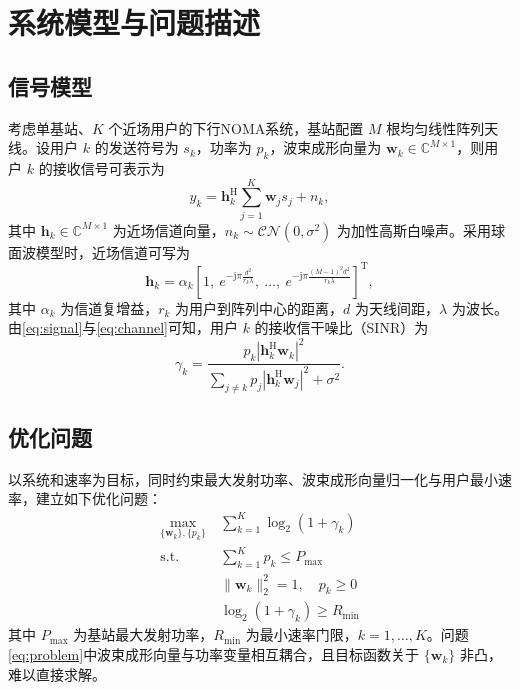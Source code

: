 \documentclass[UTF8, a4paper, zihao=-4, fontset=windows, twocolumn]{ctexart}
\theoremstyle{plain}
\theoremstyle{definition}
\theoremstyle{plain}
\begin{document}
\section{系统模型与问题描述}\label{sec:model}

\subsection{信号模型}\label{sec:signal}

考虑单基站、$K$ 个近场用户的下行NOMA系统，基站配置 $M$ 根均匀线性阵列天线。设用户 $k$ 的发送符号为 $s_k$，功率为 $p_k$，波束成形向量为 $\mathbf{w}_k\in\mathbb{C}^{M\times 1}$，则用户 $k$ 的接收信号可表示为
\begin{equation}
y_k = \mathbf{h}_k^{\mathrm{H}}\sum_{j=1}^{K}\mathbf{w}_j s_j + n_k,
\label{eq:signal}
\end{equation}
其中 $\mathbf{h}_k\in\mathbb{C}^{M\times 1}$ 为近场信道向量，$n_k\sim\mathcal{CN}(0,\sigma^2)$ 为加性高斯白噪声。采用球面波模型时，近场信道可写为
\begin{equation}
\mathbf{h}_k = \alpha_k\left[1,\ e^{-\mathrm{j}\pi\frac{d^2}{r_k\lambda}},\ \ldots,\ e^{-\mathrm{j}\pi\frac{(M-1)^2d^2}{r_k\lambda}}\right]^{\mathrm{T}},
\label{eq:channel}
\end{equation}
其中 $\alpha_k$ 为信道复增益，$r_k$ 为用户到阵列中心的距离，$d$ 为天线间距，$\lambda$ 为波长。由\eqref{eq:signal}与\eqref{eq:channel}可知，用户 $k$ 的接收信干噪比（SINR）为
\begin{equation}
\gamma_k = \frac{p_k\left|\mathbf{h}_k^{\mathrm{H}}\mathbf{w}_k\right|^2}
{\sum_{j\neq k}p_j\left|\mathbf{h}_k^{\mathrm{H}}\mathbf{w}_j\right|^2+\sigma^2}.
\label{eq:sinr}
\end{equation}

\subsection{优化问题}\label{sec:problem}

以系统和速率为目标，同时约束最大发射功率、波束成形向量归一化与用户最小速率，建立如下优化问题：
\begin{equation}
\begin{aligned}
\max_{\{\mathbf{w}_k\},\{p_k\}}\ & \sum_{k=1}^{K}\log_2\left(1+\gamma_k\right)\\
\text{s.t.}\ & \sum_{k=1}^{K}p_k\le P_{\max}\\
& \|\mathbf{w}_k\|_2^2=1,\quad p_k\ge 0\\
& \log_2\left(1+\gamma_k\right)\ge R_{\min}
\end{aligned}
\label{eq:problem}
\end{equation}
其中 $P_{\max}$ 为基站最大发射功率，$R_{\min}$ 为最小速率门限，$k=1,\ldots,K$。问题\eqref{eq:problem}中波束成形向量与功率变量相互耦合，且目标函数关于 $\{\mathbf{w}_k\}$ 非凸，难以直接求解。
\end{document}

